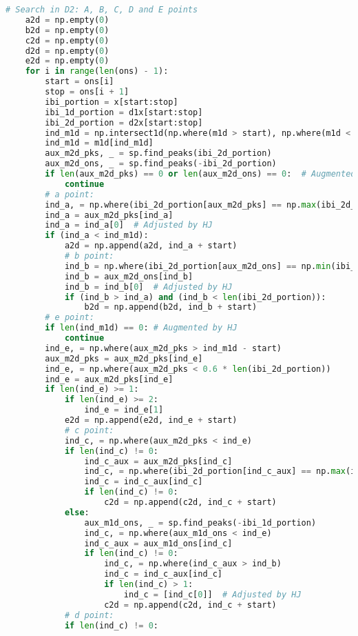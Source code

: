 \begin{lstlisting}[language=Python,label={lst:fidp.py}, basicstyle=\scriptsize]
    # Search in D2: A, B, C, D and E points
    a2d = np.empty(0)
    b2d = np.empty(0)
    c2d = np.empty(0)
    d2d = np.empty(0)
    e2d = np.empty(0)
    for i in range(len(ons) - 1):
        start = ons[i]
        stop = ons[i + 1]
        ibi_portion = x[start:stop]
        ibi_1d_portion = d1x[start:stop]
        ibi_2d_portion = d2x[start:stop]
        ind_m1d = np.intersect1d(np.where(m1d > start), np.where(m1d < stop))
        ind_m1d = m1d[ind_m1d]
        aux_m2d_pks, _ = sp.find_peaks(ibi_2d_portion)
        aux_m2d_ons, _ = sp.find_peaks(-ibi_2d_portion)
        if len(aux_m2d_pks) == 0 or len(aux_m2d_ons) == 0:  # Augmented by HJ
            continue
        # a point:
        ind_a, = np.where(ibi_2d_portion[aux_m2d_pks] == np.max(ibi_2d_portion[aux_m2d_pks]))
        ind_a = aux_m2d_pks[ind_a]
        ind_a = ind_a[0]  # Adjusted by HJ
        if (ind_a < ind_m1d):
            a2d = np.append(a2d, ind_a + start)
            # b point:
            ind_b = np.where(ibi_2d_portion[aux_m2d_ons] == np.min(ibi_2d_portion[aux_m2d_ons]))
            ind_b = aux_m2d_ons[ind_b]
            ind_b = ind_b[0]  # Adjusted by HJ
            if (ind_b > ind_a) and (ind_b < len(ibi_2d_portion)):
                b2d = np.append(b2d, ind_b + start)
        # e point:
        if len(ind_m1d) == 0: # Augmented by HJ
            continue
        ind_e, = np.where(aux_m2d_pks > ind_m1d - start)
        aux_m2d_pks = aux_m2d_pks[ind_e]
        ind_e, = np.where(aux_m2d_pks < 0.6 * len(ibi_2d_portion))
        ind_e = aux_m2d_pks[ind_e]
        if len(ind_e) >= 1:
            if len(ind_e) >= 2:
                ind_e = ind_e[1]
            e2d = np.append(e2d, ind_e + start)
            # c point:
            ind_c, = np.where(aux_m2d_pks < ind_e)
            if len(ind_c) != 0:
                ind_c_aux = aux_m2d_pks[ind_c]
                ind_c, = np.where(ibi_2d_portion[ind_c_aux] == np.max(ibi_2d_portion[ind_c_aux]))
                ind_c = ind_c_aux[ind_c]
                if len(ind_c) != 0:
                    c2d = np.append(c2d, ind_c + start)
            else:
                aux_m1d_ons, _ = sp.find_peaks(-ibi_1d_portion)
                ind_c, = np.where(aux_m1d_ons < ind_e)
                ind_c_aux = aux_m1d_ons[ind_c]
                if len(ind_c) != 0:
                    ind_c, = np.where(ind_c_aux > ind_b)
                    ind_c = ind_c_aux[ind_c]
                    if len(ind_c) > 1:
                        ind_c = [ind_c[0]]  # Adjusted by HJ
                    c2d = np.append(c2d, ind_c + start)
            # d point:
            if len(ind_c) != 0:

\end{lstlisting}
